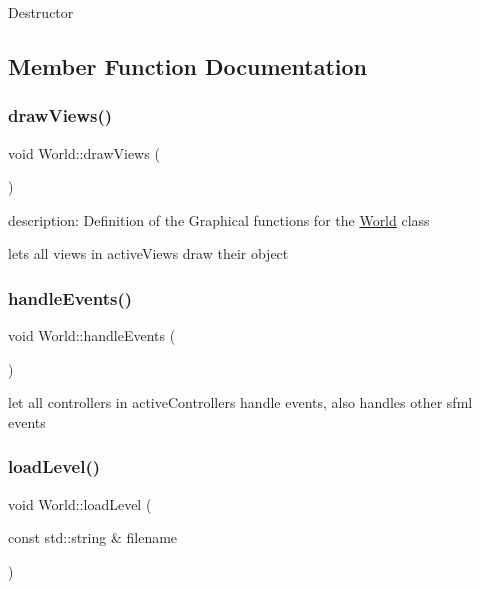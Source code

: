 Destructor 

\subsection{Member Function Documentation}
\mbox{\label{classWorld_a8e8ad60668f8fe975f03bcb612264bc4}} 
\subsubsection{\texorpdfstring{draw\+Views()}{drawViews()}}
{\footnotesize\ttfamily void World\+::draw\+Views (\begin{DoxyParamCaption}{ }\end{DoxyParamCaption})}



description\+: Definition of the Graphical functions for the \hyperlink{classWorld}{World} class 

lets all views in active\+Views draw their object \mbox{\label{classWorld_ad37fe32cce284282361b9e7397b27a23}} 
\subsubsection{\texorpdfstring{handle\+Events()}{handleEvents()}}
{\footnotesize\ttfamily void World\+::handle\+Events (\begin{DoxyParamCaption}{ }\end{DoxyParamCaption})}

let all controllers in active\+Controllers handle events, also handles other sfml events \mbox{\label{classWorld_a6a08c827c3a0def12b7700211353735f}} 
\subsubsection{\texorpdfstring{load\+Level()}{loadLevel()}}
{\footnotesize\ttfamily void World\+::load\+Level (\begin{DoxyParamCaption}\item[{const std\+::string \&}]{filename }\end{DoxyParamCaption})}



